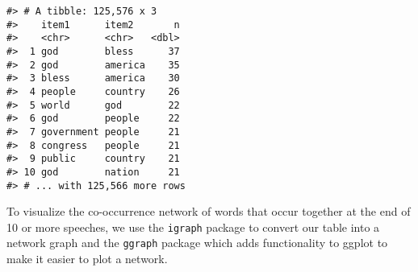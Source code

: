 \documentclass[
]{book}
\newenvironment{Shaded}{\begin{snugshade}}{\end{snugshade}}
\newcommand{\AttributeTok}[1]{\textcolor[rgb]{0.77,0.63,0.00}{#1}}
\newcommand{\CommentTok}[1]{\textcolor[rgb]{0.56,0.35,0.01}{\textit{#1}}}
\newcommand{\ConstantTok}[1]{\textcolor[rgb]{0.00,0.00,0.00}{#1}}
\newcommand{\DecValTok}[1]{\textcolor[rgb]{0.00,0.00,0.81}{#1}}
\newcommand{\FunctionTok}[1]{\textcolor[rgb]{0.00,0.00,0.00}{#1}}
\newcommand{\NormalTok}[1]{#1}
\newcommand{\OtherTok}[1]{\textcolor[rgb]{0.56,0.35,0.01}{#1}}
\newcommand{\SpecialCharTok}[1]{\textcolor[rgb]{0.00,0.00,0.00}{#1}}
\begin{document}
\begin{Shaded}
\end{Shaded}

\begin{verbatim}
#> # A tibble: 125,576 x 3
#>    item1      item2       n
#>    <chr>      <chr>   <dbl>
#>  1 god        bless      37
#>  2 god        america    35
#>  3 bless      america    30
#>  4 people     country    26
#>  5 world      god        22
#>  6 god        people     22
#>  7 government people     21
#>  8 congress   people     21
#>  9 public     country    21
#> 10 god        nation     21
#> # ... with 125,566 more rows
\end{verbatim}

To visualize the co-occurrence network of words that occur together at the end of 10 or more speeches, we use the \texttt{igraph} package to convert our table into a network graph and the \texttt{ggraph} package which adds functionality to ggplot to make it easier to plot a network.
\end{document}
